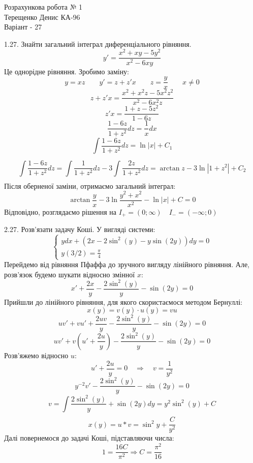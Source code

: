 \documentclass[14pt,a4paper]{scrartcl}
\theoremstyle{definition}
\newtheorem{defo}{Означення}[section]
\theoremstyle{remark}
\theoremstyle{definition}
\theoremstyle{definition}
\begin{document}
\def\be{\begin{equation}}
\def\ee{\end{equation}}
\def\bd{\begin{defo}}
\def\ed{\end{defo}}
\def\bbt{\begin{boxteo}}
\def\ebt{\end{boxteo}}
\begin{center}
Розрахункова робота № 1 \\
	Терещенко Денис КА-96 \\
	Варіант - 27
\end{center}

1.27. Знайти загальний інтеграл диференціального рівняння.
$$
y' = \frac{x^2 + xy - 5y^2}{ x^2 - 6xy}
$$
Це однорідне рівняння. Зробимо заміну:
$$
y = xz \qquad y' = z + z'x \qquad  z = \frac{y}{x} \qquad x\neq 0
$$
$$
z  + z'x = \frac{x^2 + x^2z - 5x^2z^2}{x^2 - 6 x^2 z}
$$
$$
z'x = \frac{1 + z - 5z^2}{1-6z}
$$
$$
\frac{1-6z}{1+z^2} dz = \frac{1}{x} dx
$$
$$
 \int\limits_{}^{}{ \frac{1-6z}{1+z^2}dz } = \ln{ \left| x \right| 	} + C_1
$$
$$
 \int\limits_{}^{}{ \frac{1-6z}{1+z^2}dz } =  \int\limits_{}^{}{ \frac{1}{1+z^2} dz } -3 \int\limits_{}^{}{ \frac{2z}{1+z^2}dz }
= \arctan{z} - 3\ln{ \left| 1+z^2 \right| } + C_2
$$
Після оберненої заміни, отримаємо загальний інтеграл:
$$
\arctan{ \frac{y}{x} } - 3\ln{\frac{y^2+ x^2}{x^2} } - \ln{ \left| x \right| } + C = 0
$$
Відповідно, розглядаємо рішення на $I_+ = (0; \infty) \quad I_- = (-\infty; 0)$

\pagebreak

2.27. Розв'язати задачу Коші. У вигляді системи:
$$
\left\lbrace
\begin{gathered}
ydx + (2x - 2 \sin^2{(y)} - y \sin{(2y)}  )dy = 0\\
y(3/2) = \frac{\pi}{4}
\end{gathered}
 \right.
$$
Перейдемо від рівняння Пфаффа до зручного вигляду лінійного рівняння. Але, розв'язок будемо шукати відносно змінної $x$:
$$
x' + \frac{2x}{y} - \frac{2 \sin^2{(y)} }{y} - \sin{(2y)} = 0
$$
Прийшли до лінійного рівняння, для якого скористаємося методом Бернуллі:
$$
x(y) = v(y)\cdot u(y) =vu
$$
$$
uv' + vu' + \frac{2uv}{y} - \frac{2 \sin^2{(y)} }{y} - \sin{(2y)} =0
$$
$$
uv' + v (u' + \frac{2u}{y} ) - \frac{2 \sin^2{(y)} }{y} - \sin{(2y)} =0
$$
Розв'яжемо відносно $u$:
$$
u' + \frac{2u}{y} = 0 \quad \Longrightarrow \quad v = \frac{1}{y^2}
$$
$$
y^{-2}v'  - \frac{2 \sin^2{(y)} }{y} - \sin{(2y)} =0
$$
$$
v =  \int\limits_{}^{}{\frac{2 \sin^2{(y)} }{y} + \sin{(2y)}dy} = y^2 \sin^2{(y)} + C
$$
$$
x(y) = u*v = \sin^2{y} + \frac{C}{y^2}
$$
Далі повернемося до задачі Коші, підставляючи числа:
$$
1 = \frac{16C}{ \pi^2} \Longrightarrow C = \frac{\pi^2}{16}
$$
\end{document}
